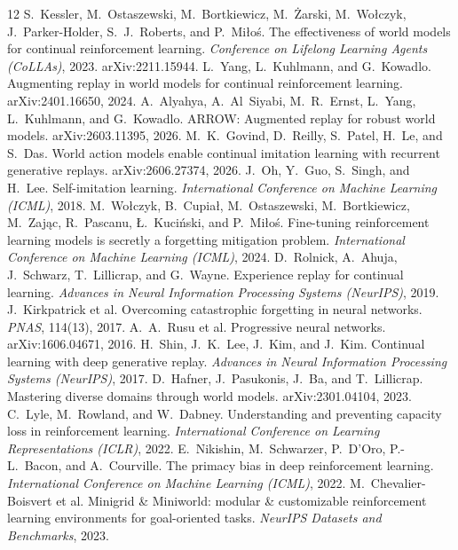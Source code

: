 \documentclass[10pt]{article}
\begin{document}
\begin{thebibliography}{12}
 S.~Kessler, M.~Ostaszewski, M.~Bortkiewicz, M.~\.Zarski,
M.~Wo\l{}czyk, J.~Parker-Holder, S.~J.~Roberts, and P.~Mi\l{}o\'s.
The effectiveness of world models for continual reinforcement learning.
\emph{Conference on Lifelong Learning Agents (CoLLAs)}, 2023. arXiv:2211.15944.
 L.~Yang, L.~Kuhlmann, and G.~Kowadlo.
Augmenting replay in world models for continual reinforcement learning. arXiv:2401.16650,
2024.
 A.~Alyahya, A.~Al~Siyabi, M.~R.~Ernst, L.~Yang, L.~Kuhlmann, and
G.~Kowadlo. ARROW: Augmented replay for robust world models. arXiv:2603.11395, 2026.
 M.~K.~Govind, D.~Reilly, S.~Patel, H.~Le, and S.~Das.
World action models enable continual imitation learning with recurrent generative replays.
arXiv:2606.27374, 2026.
 J.~Oh, Y.~Guo, S.~Singh, and H.~Lee. Self-imitation learning.
\emph{International Conference on Machine Learning (ICML)}, 2018.
 M.~Wo\l{}czyk, B.~Cupia\l{}, M.~Ostaszewski, M.~Bortkiewicz,
M.~Zaj\k{a}c, R.~Pascanu, \L{}.~Kuci\'nski, and P.~Mi\l{}o\'s. Fine-tuning reinforcement
learning models is secretly a forgetting mitigation problem.
\emph{International Conference on Machine Learning (ICML)}, 2024.
 D.~Rolnick, A.~Ahuja, J.~Schwarz, T.~Lillicrap, and
G.~Wayne. Experience replay for continual learning.
\emph{Advances in Neural Information Processing Systems (NeurIPS)}, 2019.
 J.~Kirkpatrick et al. Overcoming catastrophic
forgetting in neural networks. \emph{PNAS}, 114(13), 2017.
 A.~A.~Rusu et al. Progressive neural networks.
arXiv:1606.04671, 2016.
 H.~Shin, J.~K.~Lee, J.~Kim, and J.~Kim. Continual learning with
deep generative replay.
\emph{Advances in Neural Information Processing Systems (NeurIPS)}, 2017.
 D.~Hafner, J.~Pasukonis, J.~Ba, and T.~Lillicrap.
Mastering diverse domains through world models. arXiv:2301.04104, 2023.
 C.~Lyle, M.~Rowland, and W.~Dabney. Understanding and
preventing capacity loss in reinforcement learning.
\emph{International Conference on Learning Representations (ICLR)}, 2022.
 E.~Nikishin, M.~Schwarzer, P.~D'Oro, P.-L.~Bacon, and
A.~Courville. The primacy bias in deep reinforcement learning.
\emph{International Conference on Machine Learning (ICML)}, 2022.
 M.~Chevalier-Boisvert et al. Minigrid \& Miniworld: modular
\& customizable reinforcement learning environments for goal-oriented tasks.
\emph{NeurIPS Datasets and Benchmarks}, 2023.
\end{thebibliography}
\end{document}
